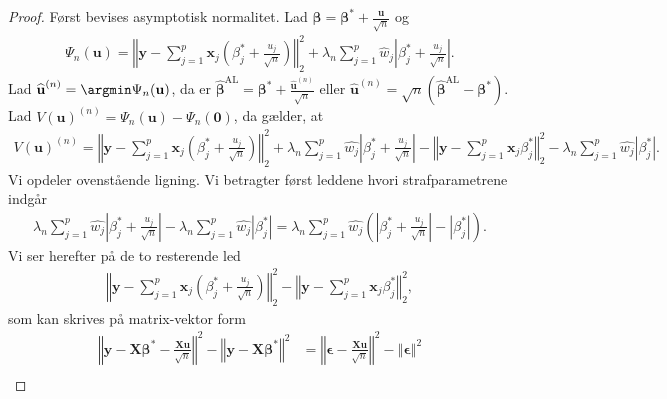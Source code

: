 \begin{proof}
Først bevises asymptotisk normalitet. Lad $\boldsymbol{\beta}=\boldsymbol{\beta}^{*} +\frac{\textbf{u}}{\sqrt{n}}$ og
\begin{align*}
\Psi_n(\textbf{u})=\left\Vert \mathbf{y}-\sum_{j=1}^p \textbf{x}_j \left( \beta_j^{*} +\frac{u_j}{\sqrt{n}} \right) \right\Vert_2^2 + \lambda_n \sum_{j=1}^p \widehat{w}_j \left\vert \beta_j^{*} + \frac{u_j}{\sqrt{n}} \right\vert.
\end{align*}
Lad $\widehat{\textbf{u}}^{(n)}=\argmin \Psi_n(\textbf{u})$, da er $\widehat{\boldsymbol{\beta}}^{{\text{AL}}}=\boldsymbol{\beta}^{*} + \frac{\widehat{\boldsymbol{u}}^{(n)}}{\sqrt{n}}$ eller $\widehat{\boldsymbol{u}}^{(n)}=\sqrt{n}\left(\widehat{\boldsymbol{\beta}}^{\text{AL}}-\boldsymbol{\beta}^{*}\right)$.
Lad $V(\mathbf{u})^{(n)}=\Psi_n(\textbf{u}) - \Psi_n(\textbf{0})$, da gælder, at
\begin{align*}
V(\mathbf{u})^{(n)}= \left\Vert \textbf{y} - \sum_{j=1}^p \textbf{x}_j \left( \beta_j^{*} + \frac{u_j}{\sqrt{n}} \right) \right\Vert_2^2 +
\lambda_n \sum_{j=1}^p \widehat{w_j} \left\vert \beta_j^{*} + \frac{u_j}{\sqrt{n}} \right\vert 
-
\left\Vert \textbf{y} - \sum_{j=1}^p \textbf{x}_j \beta_j^{*} \right\Vert_2^2 - \lambda_n \sum_{j=1}^p \widehat{w_j} \left\vert \beta_j^{*} \right\vert.
\end{align*}
Vi opdeler ovenstående ligning.
Vi betragter først leddene hvori strafparametrene indgår
\begin{align*}
\lambda_n \sum_{j=1}^p \widehat{w_j} \left\vert \beta_j^{*} + \frac{u_j}{\sqrt{n}} \right\vert- \lambda_n \sum_{j=1}^p \widehat{w_j} \left\vert \beta_j^{*} \right\vert 
= \lambda_n \sum_{j=1}^p \widehat{w_j} \left( \left\vert \beta_j^{*} + \frac{u_j}{\sqrt{n}} \right\vert - \left\vert \beta_j^{*} \right\vert
\right).
\end{align*}
Vi ser herefter på de to resterende led
\begin{align*}
\left\Vert \textbf{y} - \sum_{j=1}^p \textbf{x}_j \left( \beta_j^{*} + \frac{u_j}{\sqrt{n}} \right) \right\Vert_2^2 -\left\Vert \textbf{y} - \sum_{j=1}^p \textbf{x}_j \beta_j^{*} \right\Vert_2^2,
\end{align*}
som kan skrives på matrix-vektor form
\begin{align*}
\left\Vert \textbf{y}-\textbf{X}\boldsymbol{\beta}^{*} -\frac{\textbf{X}\textbf{u}}{\sqrt{n}} \right\Vert^2 - \left\Vert \textbf{y} - \textbf{X} \boldsymbol{\beta}^{*} \right\Vert^2  & =
\left\Vert \boldsymbol{\epsilon} - \frac{\textbf{X}\textbf{u}}{\sqrt{n}} \right\Vert^2 - \left\Vert \boldsymbol{\epsilon} \right\Vert^2  \\

\end{align*}
\end{proof}
